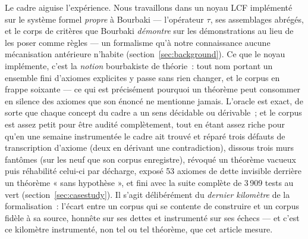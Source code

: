 \documentclass[11pt]{article}
\theoremstyle{remark}\newtheorem{example}{Exemple}
\begin{document}
Le cadre aiguise l'expérience. Nous travaillons dans un noyau LCF implémenté sur le
système formel \emph{propre} à Bourbaki --- l'opérateur $\tau$, ses assemblages
abrégés, et le corps de critères que Bourbaki \emph{démontre} sur les démonstrations
au lieu de les poser comme règles --- un formalisme qu'à notre connaissance aucune
mécanisation antérieure n'habite (section~\ref{sec:background}). Ce que le noyau
implémente, c'est la \emph{notion} bourbakiste de théorie~: tout nom portant un
ensemble fini d'axiomes explicites y passe sans rien changer, et le corpus en frappe
soixante --- ce qui est précisément pourquoi un théorème peut consommer en silence des
axiomes que son énoncé ne mentionne jamais.
L'oracle est exact, de
sorte que chaque concept du cadre a un sens décidable ou dérivable~; et le corpus est
assez petit pour être audité complètement, tout en étant assez riche pour qu'en une
semaine instrumentée le cadre ait trouvé et réparé trois défauts de transcription
d'axiome (deux en dérivant une contradiction), dissous trois murs fantômes (sur les
neuf que son corpus enregistre), révoqué un théorème vacueux puis réhabilité celui-ci
par décharge, exposé 53 axiomes de dette invisible derrière un théorème « sans
hypothèse », et fini avec la suite complète de 3\,909 tests au vert
(section~\ref{sec:casestudy}). Il s'agit délibérément du \emph{dernier kilomètre} de la
formalisation~: l'écart entre un corpus qui se contente de construire et un corpus
fidèle à sa source, honnête sur ses dettes et instrumenté sur ses échecs --- et c'est
ce kilomètre instrumenté, non tel ou tel théorème, que cet article mesure.
\end{document}
